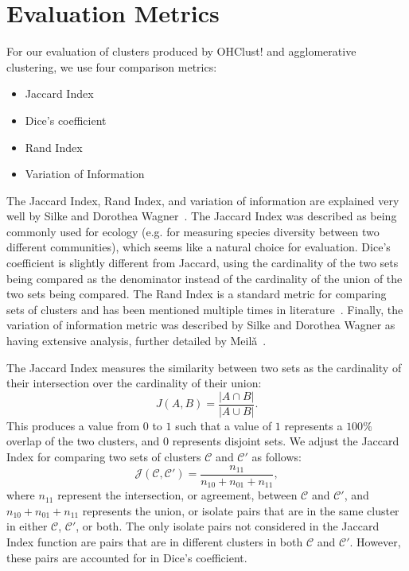 \documentclass[12pt]{ucthesis}
\begin{document}
   \section{Evaluation Metrics}\label{sec:eval_metrics}
      For our evaluation of clusters produced by \textsf{OHClust!} and
      \textsf{agglomerative clustering}, we use four comparison metrics:
      \begin{itemize}
         \item Jaccard Index
         \item Dice's coefficient
         \item Rand Index
         \item Variation of Information
      \end{itemize}
      The Jaccard Index, Rand Index, and variation of information are explained
      very well by Silke and Dorothea Wagner~\cite{Wagner:Overview}. The
      Jaccard Index was described as being commonly used for ecology (e.g. for
      measuring species diversity between two different communities), which
      seems like a natural choice for evaluation. Dice's coefficient is
      slightly different from Jaccard, using the cardinality of the two sets
      being compared as the denominator instead of the cardinality of the union
      of the two sets being compared. The Rand Index is a standard metric for
      comparing sets of clusters and has been mentioned multiple times in
      literature~\cite{Wagner:Overview, Youness:Partitions}. Finally, the
      variation of information metric was described by Silke and
      Dorothea Wagner as having extensive analysis, further detailed by
      Meil\v{a}~\cite{Meila:Axiomatic}.

      The Jaccard Index measures the similarity between two sets as the
      cardinality of their intersection over the cardinality of their union:
      $$J(A, B) = \frac{|A\cap B|}{|A\cup B|}.$$
      This produces a value from $0$ to $1$ such that a value of $1$ represents
      a $100\%$ overlap of the two clusters, and $0$ represents disjoint
      sets. We adjust the Jaccard Index for comparing two sets of clusters
      $\mathcal{C}$ and $\mathcal{C}'$ as follows:
      $$
         \mathcal{J}(\mathcal{C}, \mathcal{C}') =
         \frac{n_{11}}{n_{10} + n_{01} + n_{11}},
      $$
      where $n_{11}$ represent the intersection, or agreement, between
      $\mathcal{C}$ and $\mathcal{C}'$, and $n_{10} + n_{01} + n_{11}$
      represents the union, or isolate pairs that are in the same cluster in
      either $\mathcal{C}$, $\mathcal{C}'$, or both. The only isolate pairs not
      considered in the Jaccard Index function are pairs that are in different
      clusters in both $\mathcal{C}$ and $\mathcal{C}'$. However, these pairs
      are accounted for in Dice's coefficient.
\end{document}
